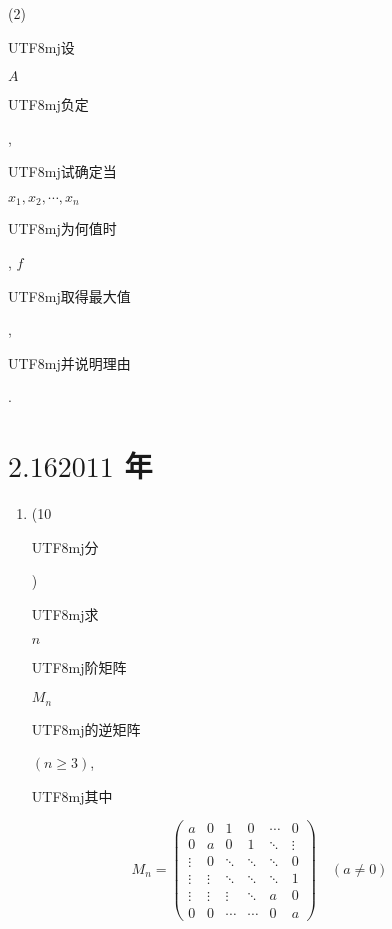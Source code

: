 \documentclass[10pt]{article}
\begin{document}
(2) \begin{CJK}{UTF8}{mj}设\end{CJK} $A$ \begin{CJK}{UTF8}{mj}负定\end{CJK}, \begin{CJK}{UTF8}{mj}试确定当\end{CJK} $x_{1}, x_{2}, \cdots, x_{n}$ \begin{CJK}{UTF8}{mj}为何值时\end{CJK}, $f$ \begin{CJK}{UTF8}{mj}取得最大值\end{CJK}, \begin{CJK}{UTF8}{mj}并说明理由\end{CJK}.

\section{$2.162011$ 年}
\begin{enumerate}
  \item (10 \begin{CJK}{UTF8}{mj}分\end{CJK}) \begin{CJK}{UTF8}{mj}求\end{CJK} $n$ \begin{CJK}{UTF8}{mj}阶矩阵\end{CJK} $M_{n}$ \begin{CJK}{UTF8}{mj}的逆矩阵\end{CJK} $(n \geqslant 3)$, \begin{CJK}{UTF8}{mj}其中\end{CJK}
\end{enumerate}
$$
M_{n}=\left(\begin{array}{cccccc}
a & 0 & 1 & 0 & \cdots & 0 \\
0 & a & 0 & 1 & \ddots & \vdots \\
\vdots & 0 & \ddots & \ddots & \ddots & 0 \\
\vdots & \vdots & \ddots & \ddots & \ddots & 1 \\
\vdots & \vdots & \vdots & \ddots & a & 0 \\
0 & 0 & \cdots & \cdots & 0 & a
\end{array}\right) \quad(a \neq 0)
$$
\end{document}
